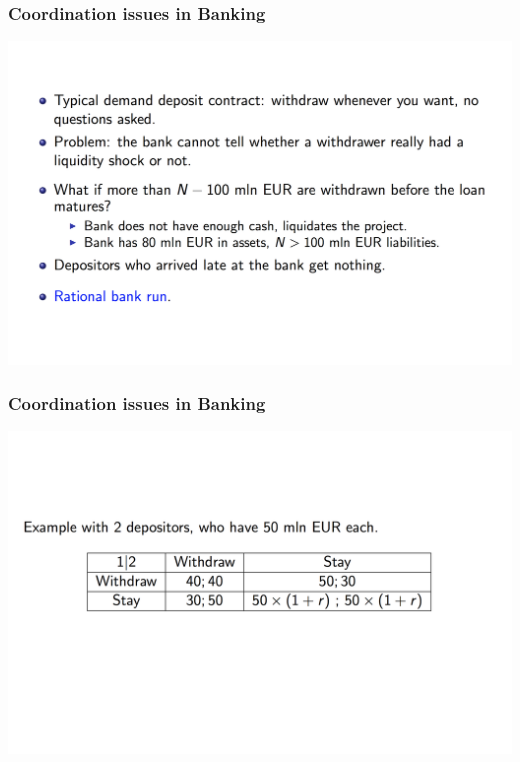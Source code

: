 \documentclass[11pt]{beamer}
\begin{document}
\begin{frame}
  \frametitle{Coordination issues in Banking}
  \begin{center}
    \includegraphics[width=\textwidth]{Figures/bank_runs1.png}
  \end{center}
\end{frame}
\begin{frame}
  \frametitle{Coordination issues in Banking}
  \begin{center}
    \includegraphics[width=\textwidth]{Figures/bank_runs2.png}
  \end{center}
\end{frame}
\end{document}
